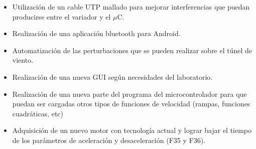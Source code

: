 \begin{itemize}
	\item Utilización de un cable UTP mallado para mejorar interferencias que puedan producirse entre el variador y el $\mu$C.
\item Realización de una aplicación bluetooth para Android.
\item Automatización de las perturbaciones que se pueden realizar sobre el túnel de viento.
\item Realización de una nueva GUI según necesidades del laboratorio.
\item Realización de una nueva parte del programa del microcontrolador para que puedan ser cargadas otros tipos de funciones de velocidad (rampas, funciones cuadráticas, etc)
\item Adquisición de un nuevo motor con tecnología actual y lograr bajar el tiempo de los parámetros de aceleración y desaceleración (F35 y F36).
\end{itemize}